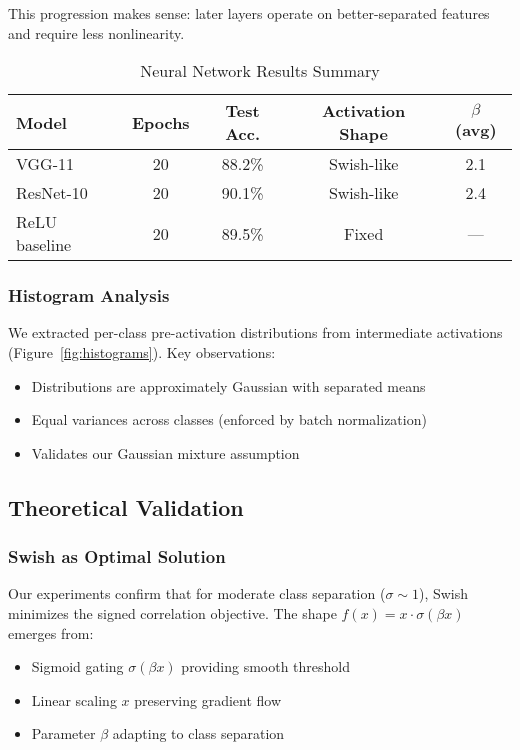 \documentclass{article}
\begin{document}
This progression makes sense: later layers operate on better-separated features and require less nonlinearity.

\begin{table}[t]
\centering
\caption{Neural Network Results Summary}
\label{tab:nn_results}
\begin{tabular}{lcccc}
\hline
Model & Epochs & Test Acc. & Activation Shape & $\beta$ (avg) \\
\hline
VGG-11 & 20 & 88.2\% & Swish-like & 2.1 \\
ResNet-10 & 20 & 90.1\% & Swish-like & 2.4 \\
ReLU baseline & 20 & 89.5\% & Fixed & --- \\
\hline
\end{tabular}
\end{table}

\subsubsection{Histogram Analysis}

We extracted per-class pre-activation distributions from intermediate activations (Figure~\ref{fig:histograms}). Key observations:
\begin{itemize}
\item Distributions are approximately Gaussian with separated means
\item Equal variances across classes (enforced by batch normalization)
\item Validates our Gaussian mixture assumption
\end{itemize}

\subsection{Theoretical Validation}

\subsubsection{Swish as Optimal Solution}

Our experiments confirm that for moderate class separation ($\sigma \sim 1$), Swish minimizes the signed correlation objective. The shape $f(x) = x \cdot \sigma(\beta x)$ emerges from:
\begin{itemize}
\item Sigmoid gating $\sigma(\beta x)$ providing smooth threshold
\item Linear scaling $x$ preserving gradient flow
\item Parameter $\beta$ adapting to class separation
\end{itemize}
\end{document}

